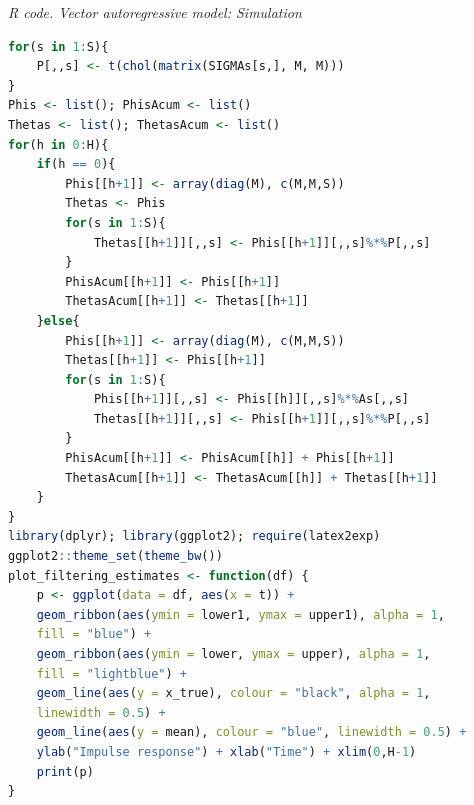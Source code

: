 \begin{enumerate}[leftmargin=*]
\begin{tcolorbox}[enhanced,width=4.67in,center upper,
	fontupper=\large\bfseries,drop shadow southwest,sharp corners]
	\textit{R code. Vector autoregressive model: Simulation}
	\begin{VF}
		\begin{lstlisting}[language=R]
for(s in 1:S){
	P[,,s] <- t(chol(matrix(SIGMAs[s,], M, M))) 
}
Phis <- list(); PhisAcum <- list() 
Thetas <- list(); ThetasAcum <- list()
for(h in 0:H){
	if(h == 0){
		Phis[[h+1]] <- array(diag(M), c(M,M,S))
		Thetas <- Phis
		for(s in 1:S){
			Thetas[[h+1]][,,s] <- Phis[[h+1]][,,s]%*%P[,,s]
		}
		PhisAcum[[h+1]] <- Phis[[h+1]]
		ThetasAcum[[h+1]] <- Thetas[[h+1]]
	}else{
		Phis[[h+1]] <- array(diag(M), c(M,M,S))
		Thetas[[h+1]] <- Phis[[h+1]]
		for(s in 1:S){
			Phis[[h+1]][,,s] <- Phis[[h]][,,s]%*%As[,,s]
			Thetas[[h+1]][,,s] <- Phis[[h+1]][,,s]%*%P[,,s]
		}
		PhisAcum[[h+1]] <- PhisAcum[[h]] + Phis[[h+1]]
		ThetasAcum[[h+1]] <- ThetasAcum[[h]] + Thetas[[h+1]]
	}
}
library(dplyr); library(ggplot2); require(latex2exp)
ggplot2::theme_set(theme_bw())
plot_filtering_estimates <- function(df) {
	p <- ggplot(data = df, aes(x = t)) +
	geom_ribbon(aes(ymin = lower1, ymax = upper1), alpha = 1,
	fill = "blue") +
	geom_ribbon(aes(ymin = lower, ymax = upper), alpha = 1,
	fill = "lightblue") +
	geom_line(aes(y = x_true), colour = "black", alpha = 1,
	linewidth = 0.5) +
	geom_line(aes(y = mean), colour = "blue", linewidth = 0.5) +
	ylab("Impulse response") + xlab("Time") + xlim(0,H-1)
	print(p)
}
\end{lstlisting}
	\end{VF}
\end{tcolorbox} 


\end{enumerate}
